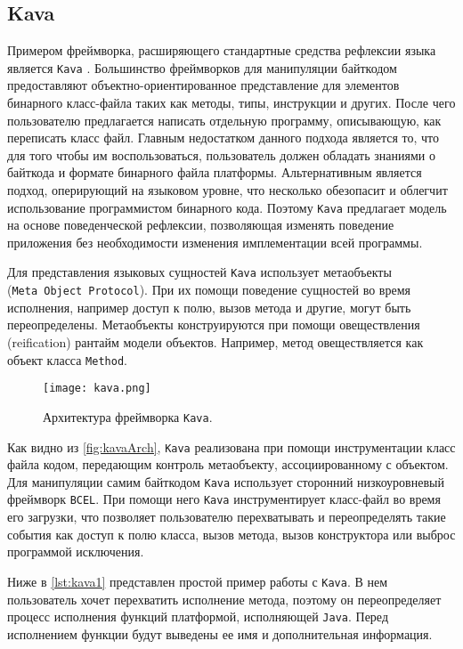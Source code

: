 \subsection{Kava}

Примером фреймворка, расширяющего стандартные средства рефлексии языка является \texttt{Kava} \cite{kava1} \cite{kava2}. Большинство фреймворков для манипуляции байткодом предоставляют объектно-ориентированное представление для элементов бинарного класс-файла таких как методы, типы, инструкции и других. После чего пользователю предлагается написать отдельную программу, описывающую, как переписать класс файл. Главным недостатком данного подхода является то, что для того чтобы им воспользоваться, пользователь должен обладать знаниями о байткода и формате бинарного файла платформы. Альтернативным является подход, оперирующий на языковом уровне, что несколько обезопасит и облегчит использование программистом бинарного кода. Поэтому \texttt{Kava} предлагает модель на основе поведенческой рефлексии, позволяющая изменять поведение приложения без необходимости изменения имплементации всей программы.

Для представления языковых сущностей \texttt{Kava} использует метаобъекты (\texttt{Meta~Object~Protocol}). При их помощи поведение сущностей во время исполнения, например доступ к полю, вызов метода и другие, могут быть переопределены. Метаобъекты конструируются при помощи овеществления (reification) рантайм модели объектов. Например, метод овеществляется как объект класса \texttt{Method}.

\begin{figure}[h]
\centering
\texttt{[image: kava.png]}
\caption{Архитектура фреймворка \texttt{Kava}.}
\label{fig:kavaArch}
\end{figure}

Как видно из \autoref{fig:kavaArch}, \texttt{Kava} реализована при помощи инструментации класс файла кодом, передающим контроль метаобъекту, ассоциированному с объектом. Для манипуляции самим байткодом \texttt{Kava} использует сторонний низкоуровневый фреймворк \texttt{BCEL}. При помощи него \texttt{Kava} инструментирует класс-файл во время его загрузки, что позволяет пользователю перехватывать и переопределять такие события как доступ к полю класса, вызов метода, вызов конструктора или выброс программой исключения.

Ниже в \autoref{lst:kava1} представлен простой пример работы с \texttt{Kava}. В нем пользователь хочет перехватить исполнение метода, поэтому он переопределяет процесс исполнения функций платформой, исполняющей \texttt{Java}. Перед исполнением функции будут выведены ее имя и дополнительная информация.

